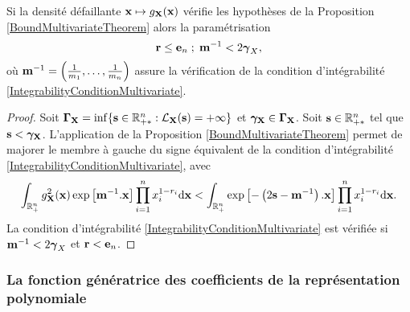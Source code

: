 \begin{Cor}\label{ParameterChoiceMultivariateCorrolary}
Si la densité défaillante $\bold{x}\mapsto g_{\bold{X}}(\bold{x})$ vérifie les hypothèses de la Proposition \ref{BoundMultivariateTheorem} alors la paramétrisation
\begin{equation}
\bold{r}\leq\bold{e}_{n}\hspace{0.1cm};\hspace{0.1cm}\bold{m}^{-1}<2\boldsymbol{\gamma}_{X},
\end{equation}
où $\bold{m}^{-1}=\left(\frac{1}{m_{1}},\ldots,\frac{1}{m_{n}}\right)$  assure la vérification de la condition d'intégrabilité \eqref{IntegrabilityConditionMultivariate}. 
\end{Cor}
\begin{proof}
Soit $\boldsymbol{\Gamma}_{\bold{X}}=\inf\{\bold{s}\in\mathbb{R}_{+*}^{n} : \mathcal{L}_{\bold{X}}(\bold{s})=+\infty\}$ et $\boldsymbol{\gamma_{\bold{X}}}\in\boldsymbol{\Gamma}_{\bold{X}}$. Soit $\bold{s}\in\mathbb{R}_{+*}^{n}$ tel que $\bold{s}<\boldsymbol{\gamma_{\bold{X}}}$. L\rq{}application de la Proposition \ref{BoundMultivariateTheorem} permet de majorer le membre à gauche du signe équivalent de la condition d\rq{}intégrabilité \eqref{IntegrabilityConditionMultivariate}, avec
\begin{equation*}
\int_{\mathbb{R}_{+}^{n}}g_{\bold{X}}^{2}(\bold{x})\exp\left[\bold{m}^{-1}.\bold{x}\right]\prod_{i=1}^{n}x_{i}^{1-r_{i}}\text{d}\bold{x}<\int_{\mathbb{R}_{+}^{n}}\exp\left[-\left(2\bold{s}-\bold{m}^{-1}\right).\bold{x}\right]\prod_{i=1}^{n}x_{i}^{1-r_{i}}\text{d}\bold{x}.
\end{equation*}
La condition d\rq{}intégrabilité \eqref{IntegrabilityConditionMultivariate} est vérifiée si $\bold{m}^{-1}<2\boldsymbol{\gamma}_{X}$ et $\bold{r}<\bold{e}_{n}$.
\end{proof}

\subsubsection{La fonction génératrice des coefficients de la représentation polynomiale}

